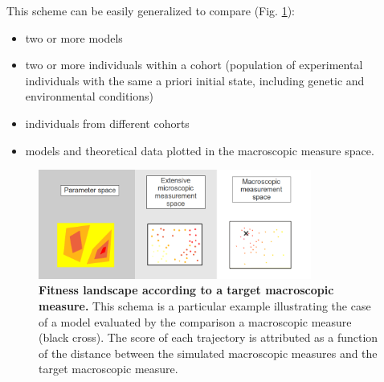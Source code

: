 This scheme can be easily generalized to compare (Fig. \ref{experimental_science_phase_diagram_distance}):
\begin{itemize}
	\item two or more models
	\item two or more individuals within a cohort (population of experimental individuals with the same a priori initial state, including genetic and environmental conditions)
	\item individuals from different cohorts
	\item models and theoretical data plotted in the macroscopic measure space.
\end{itemize}
\begin{figure}
\begin{center}
\includegraphics[width=0.8\textwidth]{../../images/experimental_science/phase_diagram_distance.png}
\end{center}
\caption{\textbf{Fitness landscape according to a target macroscopic measure.} This schema is a particular example illustrating the case of a model evaluated by the comparison a macroscopic measure (black cross). The score of each trajectory is attributed as a function of the distance between the simulated macroscopic measures and the target macroscopic measure.}
\label{experimental_science_phase_diagram_distance}
\end{figure}

